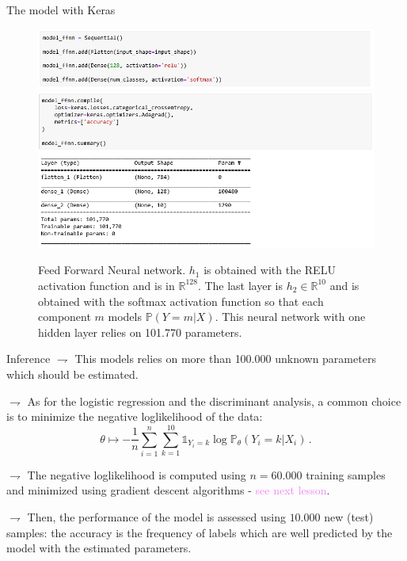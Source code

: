 \documentclass[9pt]{beamer}
\newcommand\R{\mathds{R}}
\begin{document}
\begin{frame}{The model with Keras}
\begin{figure}
\begin{center}
\includegraphics[width = .9\linewidth]{./MNIST_ffnn1.png}
\includegraphics[width = .9\linewidth]{./MNIST_ffnn2.png}
\end{center}
\caption{Feed Forward Neural network. $h_1$ is obtained with the \alert{RELU activation function and is in $\R^{128}$}. The last layer is $h_2\in\R^{10}$ and is \alert{obtained with the softmax activation function} so that each component $m$ models $\mathbb{P}(Y=m|X)$. This neural network with one hidden layer relies on 101.770 parameters.}
\end{figure}
\end{frame}

\begin{frame}{Inference}
$\rightharpoondown$ This models relies on more than \alert{100.000 unknown parameters} which should be estimated. 

\vspace{.2cm}

$\rightharpoondown$ As for the logistic regression and the discriminant analysis, a common choice is to \alert{minimize the negative loglikelihood of the data}:
$$
\theta \mapsto -\frac{1}{n} \sum_{i=1}^n\sum_{k=1}^{10} \mathds{1}_{Y_i=k}\log \mathbb{P}_{\theta}(Y_i = k | X_i)\,.
$$

\vspace{.2cm}

$\rightharpoondown$ The negative loglikelihood is computed using $n = 60.000$ training samples and \alert{minimized using gradient descent algorithms} - \textcolor{violet}{see next lesson}. 

\vspace{.2cm}

$\rightharpoondown$ Then, the performance of the model is assessed using $10.000$ new (test) samples: the \alert{accuracy is the frequency of labels which are well predicted by the model with the estimated parameters}.


\end{frame}
\end{document}
